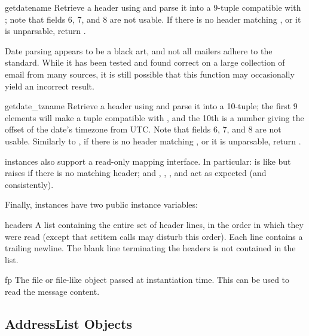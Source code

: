 \begin{methoddesc}{getdate}{name}
Retrieve a header using  and parse it into a 9-tuple
compatible with ; note that fields 6, 7, and 8 
are not usable.  If there is no header matching
, or it is unparsable, return .

Date parsing appears to be a black art, and not all mailers adhere to
the standard.  While it has been tested and found correct on a large
collection of email from many sources, it is still possible that this
function may occasionally yield an incorrect result.
\end{methoddesc}

\begin{methoddesc}{getdate_tz}{name}
Retrieve a header using  and parse it into a
10-tuple; the first 9 elements will make a tuple compatible with
, and the 10th is a number giving the offset
of the date's timezone from UTC.  Note that fields 6, 7, and 8 
are not usable.  Similarly to , if
there is no header matching , or it is unparsable, return
. 
\end{methoddesc}

 instances also support a read-only mapping interface.
In particular:  is like
 but raises  if
there is no matching header; and ,
, ,
 and  act as expected
(and consistently).

Finally,  instances have two public instance variables:

\begin{memberdesc}{headers}
A list containing the entire set of header lines, in the order in
which they were read (except that setitem calls may disturb this
order). Each line contains a trailing newline.  The
blank line terminating the headers is not contained in the list.
\end{memberdesc}

\begin{memberdesc}{fp}
The file or file-like object passed at instantiation time.  This can
be used to read the message content.
\end{memberdesc}


\subsection{AddressList Objects \label{addresslist-objects}}

